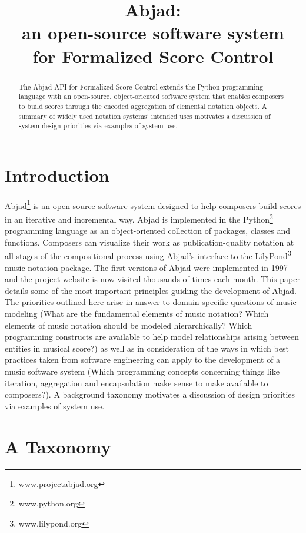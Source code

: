 \documentclass{article}
\title{Abjad: \\
an open-source software system \\
for Formalized Score Control}
\begin{document}
\capstartfalse
\maketitle
\capstarttrue

\begin{abstract}
The Abjad API for Formalized Score Control extends the Python programming
language with an open-source, object-oriented software system that enables
composers to build scores through the encoded aggregation of elemental notation
objects. A summary of widely used notation systems' intended uses motivates a
discussion of system design priorities via examples of system use.
\end{abstract}
\section{Introduction} \label{sec:introduction}

Abjad\footnote{www.projectabjad.org} is an open-source software
system designed to help composers build scores in an iterative and incremental
way.  Abjad is implemented in the Python\footnote{www.python.org} programming
language as an object-oriented collection of packages, classes
and functions. Composers can visualize their work as publication-quality
notation at all stages of the compositional process using Abjad's interface to
the LilyPond\footnote{www.lilypond.org} music notation package. The first
versions of Abjad were implemented in 1997 and the project website is now
visited thousands of times each month. This paper details some of the most
important principles guiding the development of Abjad. The priorities outlined
here arise in answer to domain-specific questions of music modeling (What are
the fundamental elements of music notation? Which elements of music notation
should be modeled hierarchically? Which programming constructs are available to
help model relationships arising between entities in musical
score?) as well as in consideration of the ways in which best practices taken
from software engineering can apply to the development of a music software
system (Which programming concepts concerning things like iteration,
aggregation and encapsulation make sense to make available to composers?).
A background taxonomy motivates a discussion of design priorities via examples
of system use.

\section{A Taxonomy} \label{sec:taxonomy}
\end{document}
